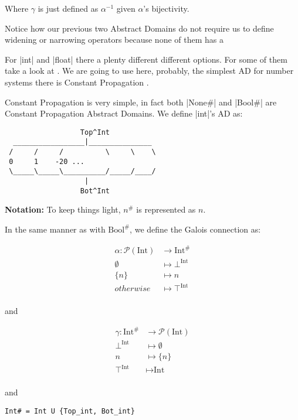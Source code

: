 Where \(\gamma{}\) is just defined as \(\alpha^{-1}\) given
\(\alpha{}\)'s bijectivity.

Notice how our previous two Abstract Domains do not require us to define
widening or narrowing operators because none of them has a

For \pycode|int| and \pycode|float| there a plenty different different
options. For some of them take a look at \textcite{mine_weakly_2004}.
We are going to use here, probably, the simplest AD for number
systems there is Constant Propagation \autocite{kildall_unified_1973}.

Constant Propagation is very simple, in fact both \pycode|None#| and
\pycode|Bool#| are Constant Propagation Abstract Domains. We define
\pycode|int|'s AD as:


\begin{verbatim}
                  Top^Int
  _________________|_______________
 /     /     /          \     \    \
 0     1    -20 ...
 \_____\_____\__________/_____/____/
                   |
                  Bot^Int
\end{verbatim}

\textbf{Notation:} To keep things light, \(n^{\#}\) is represented as
\(n\).

In the same manner as with \(\text{Bool}^{\#}\), we define the Galois
connection as:

\begin{align*}
  \alpha \colon \mathcal{P}(\text{Int}) &\to \text{Int}^{\#} \\
  \emptyset &\mapsto \bot^{\text{Int}} \\
  \{n\} &\mapsto n \\
  otherwise &\mapsto \top^{\text{Int}} \\
\end{align*}

and

\begin{align*}
  \gamma \colon \text{Int}^{\#} &\to \mathcal{P}(\text{Int}) \\
  \bot^{\text{Int}} &\mapsto \emptyset \\
  n &\mapsto \{n\} \\
  \top^{\text{Int}} &\mapsto \text{Int} \\
\end{align*}

and

\begin{verbatim}
Int# = Int U {Top_int, Bot_int}
\end{verbatim}

